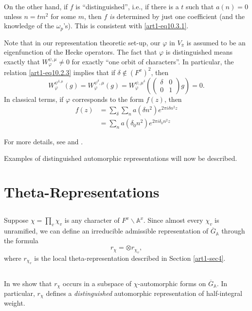 On the other hand, if $f$ is ``distinguished'', i.e., if there is a $t$ such that $a(n)=0$ unless $n=tm^{2}$ for some $m$, then $f$ {\em is} determined by just one coefficient (and the knowledge of the $\omega_{p}$'s). This is consistent with \eqref{art1-eq10.3.1}.

Note that in our representation theoretic set-up, our $\varphi$ in $V_{\overline{\pi}}$ is assumed to be an eigenfunction of the Hecke operators. The fact that $\varphi$ is distinguished means exactly that $W^{\psi,\mu}_{\varphi}\neq 0$ for exactly ``one orbit of characters''. In particular, the relation \eqref{art1-eq10.2.3} implies that if $\delta\not\in (F^{x})^{2}$, then
$$
W^{\psi^{\delta,\mu}}_{\varphi}(g)=W^{\psi^{\delta},\mu}_{\varphi}(g)=W^{\psi,\mu^{\delta}}_{\varphi}\left(\left(\begin{matrix} \delta & 0\\ 0 & 1\end{matrix}\right)g\right)=0.
$$
In classical terms, if $\varphi$ corresponds to the form $f(z)$, then 
\begin{align*}
f(z) &= \sum\limits_{\delta}\sum\limits_{n}a(\delta n^{2})e^{2\pi i\delta n^{2}z}\\
&= \sum\limits_{n}a(\delta_{0}n^{2})e^{2\pi i\delta_{0}n^{2}z}
\end{align*}

For more details, see \cite{GePS 2} and \cite{Shim}.

Examples of distinguished automorphic representations will now be described.

\section{Theta-Representations}\label{art1-sec11}

\subsection{}\label{art1-sec11.1}
Suppose $\chi=\prod\limits_{v}\chi_{v}$ is any character of $F^{x}\backslash \mathbb{A}^{x}$. Since almost every $\chi_{v}$ is unramified, we can define an irreducible admissible representation of $\overline{G}_{\mathbb{A}}$ through the formula
$$
r_{\chi}=\otimes r_{\chi_{v}},
$$
where $r_{\chi_{v}}$ is the local theta-representation described in Section \ref{art1-sec4}.

\subsection{}\label{art1-sec11.2}
In \cite{GePS2} we show that $r_{\chi}$ occurs in a subspace of $\chi$-automorphic forms on $\overline{G}_{\mathbb{A}}$. In particular, $r_{\chi}$ defines a {\em distinguished} automorphic representation of half-integral weight.

